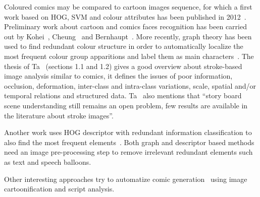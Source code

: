 Coloured comics may be compared to cartoon images sequence, for which a first work based on HOG, SVM and colour attributes has been published in 2012~\cite{Khan12}.
Preliminary work about cartoon and comics faces recognition has been carried out by Kohei~\cite{Kohei2012}, Cheung~\cite{cheung2008face} and Bernhaupt~\cite{BernhauptWSES2001}.
More recently, graph theory has been used to find redundant colour structure in order to automatically localize the most frequent colour group apparitions and label them as main characters~\cite{HoGREC2013}.
The thesis of Ta~\cite{TAPhD2010} (sections 1.1 and 1.2) gives a good overview about stroke-based image analysis similar to comics, it defines the issues of poor information, occlusion, deformation, inter-class and intra-class variations, scale, spatial and/or temporal relations and structured data.
Ta~\cite{TAPhD2010} also mentions that ``story board scene understanding still remains an open problem, few results are available in the literature about stroke images''.

Another work uses HOG descriptor with redundant information classification to also find the most frequent elements~\cite{SunICDAR2013}.
Both graph and descriptor based methods need an image pre-processing step to remove irrelevant redundant elements such as text and speech balloons.

Other interesting approaches try to automatize comic generation~\cite{Tobita2010Comic,WangHYYC12} using image cartoonification and script analysis.





